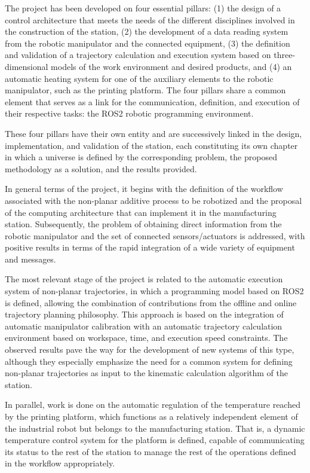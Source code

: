 The project has been developed on four essential pillars: (1) the design of a control architecture that meets the needs of the different disciplines involved in the construction of the station, (2) the development of a data reading system from the robotic manipulator and the connected equipment, (3) the definition and validation of a trajectory calculation and execution system based on three-dimensional models of the work environment and desired products, and (4) an automatic heating system for one of the auxiliary elements to the robotic manipulator, such as the printing platform. The four pillars share a common element that serves as a link for the communication, definition, and execution of their respective tasks: the ROS2 robotic programming environment.

These four pillars have their own entity and are successively linked in the design, implementation, and validation of the station, each constituting its own chapter in which a universe is defined by the corresponding problem, the proposed methodology as a solution, and the results provided.

In general terms of the project, it begins with the definition of the workflow associated with the non-planar additive process to be robotized and the proposal of the computing architecture that can implement it in the manufacturing station. Subsequently, the problem of obtaining direct information from the robotic manipulator and the set of connected sensors/actuators is addressed, with positive results in terms of the rapid integration of a wide variety of equipment and messages.

The most relevant stage of the project is related to the automatic execution system of non-planar trajectories, in which a programming model based on ROS2 is defined, allowing the combination of contributions from the offline and online trajectory planning philosophy. This approach is based on the integration of automatic manipulator calibration with an automatic trajectory calculation environment based on workspace, time, and execution speed constraints. The observed results pave the way for the development of new systems of this type, although they especially emphasize the need for a common system for defining non-planar trajectories as input to the kinematic calculation algorithm of the station.

In parallel, work is done on the automatic regulation of the temperature reached by the printing platform, which functions as a relatively independent element of the industrial robot but belongs to the manufacturing station. That is, a dynamic temperature control system for the platform is defined, capable of communicating its status to the rest of the station to manage the rest of the operations defined in the workflow appropriately.

